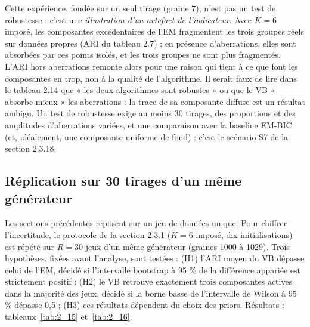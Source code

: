 Cette expérience, fondée sur un seul tirage (graine 7), n'est pas un test de robustesse : c'est une \emph{illustration d'un artefact de l'indicateur}. Avec $K = 6$ imposé, les composantes excédentaires de l'EM fragmentent les trois groupes réels sur données propres (ARI du tableau 2.7) ; en présence d'aberrations, elles sont absorbées par ces points isolés, et les trois groupes ne sont plus fragmentés. L'ARI hors aberrations remonte alors pour une raison qui tient à ce que font les composantes en trop, non à la qualité de l'algorithme. Il serait faux de lire dans le tableau 2.14 que « les deux algorithmes sont robustes » ou que le VB « absorbe mieux » les aberrations : la trace de sa composante diffuse est un résultat ambigu. Un test de robustesse exige au moins 30 tirages, des proportions et des amplitudes d'aberrations variées, et une comparaison avec la baseline EM-BIC (et, idéalement, une composante uniforme de fond) : c'est le scénario S7 de la section 2.3.18.

\subsection{Réplication sur 30 tirages d'un même générateur}
Les sections précédentes reposent sur un jeu de données unique. Pour chiffrer l'incertitude, le protocole de la section 2.3.1 ($K=6$ imposé, dix initialisations) est répété sur $R=30$ jeux d'un même générateur (graines 1000 à 1029). Trois hypothèses, fixées avant l'analyse, sont testées : (H1) l'ARI moyen du VB dépasse celui de l'EM, décidé si l'intervalle bootstrap à 95 \% de la différence appariée est strictement positif ; (H2) le VB retrouve exactement trois composantes actives dans la majorité des jeux, décidé si la borne basse de l'intervalle de Wilson à 95 \% dépasse 0,5 ; (H3) ces résultats dépendent du choix des priors. Résultats : tableaux~\ref{tab:2_15} et~\ref{tab:2_16}.

